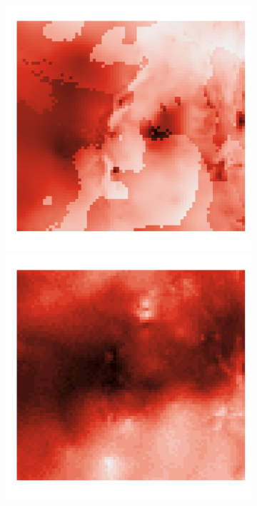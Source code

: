 \documentclass{article}
\begin{document}
\begin{figure}[t!]
\begin{subfigure}{0.3\textwidth}
	\end{subfigure}
	\begin{subfigure}{0.3\textwidth}
		\includegraphics[width=\linewidth]{figures/p_real6}\\
		\includegraphics[width=\linewidth]{figures/p_real7}\\

\end{subfigure}
\end{figure}
\end{document}

